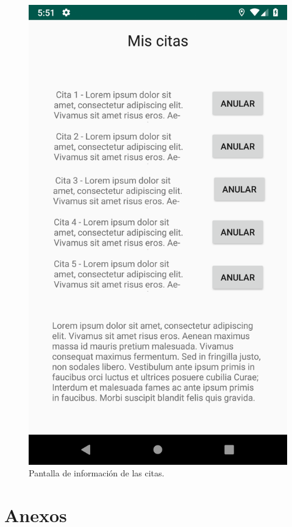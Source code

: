 \documentclass[a4paper,11pt]{article}
\begin{document}
\begin{figure}[H]
\begin{minipage}{0.45\linewidth}
\includegraphics[width=\textwidth]{miscitas.png}
\caption{Pantalla de información de las citas.}
\label{miscitas}
\end{minipage}
\end{figure}



\newpage
\section{Anexos}
\end{document}
